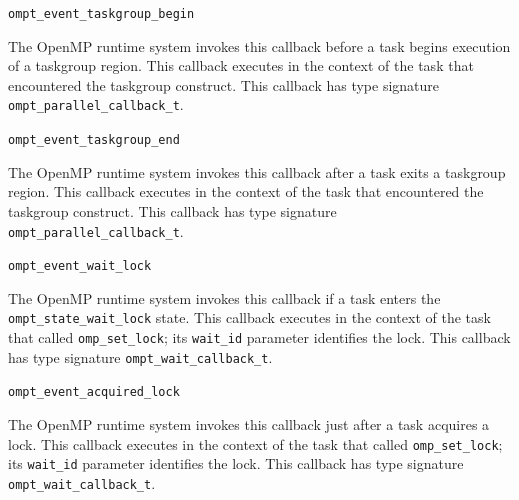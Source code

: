 \documentclass{article}
\newcommand{\descheader}[1]{{\needspace{3\baselineskip}\vspace{1em}\noindent \fbox{#1}}}
\begin{document}
\begin{description}
 
\item \verb|ompt_event_taskgroup_begin|

  The OpenMP runtime system invokes this callback before a task begins execution of a taskgroup region. This callback executes
  in the context of the task that encountered the taskgroup construct.
  This callback has type signature \verb|ompt_parallel_callback_t|. 
 
\item \verb|ompt_event_taskgroup_end|

  The OpenMP runtime system invokes this callback after a task exits a taskgroup region.  This callback
  executes in the context of the task that encountered the taskgroup construct.
  This callback has type signature \verb|ompt_parallel_callback_t|. 

\end{description}

\descheader{Locks}

\begin{description}

\item \verb|ompt_event_wait_lock| 
 
   The OpenMP runtime system invokes this callback if a task
   enters the \verb|ompt_state_wait_lock| 
   state.  This callback executes in the context of the task that called \verb|omp_set_lock|;
   its \verb|wait_id| parameter identifies the lock.
   This callback has type signature \verb|ompt_wait_callback_t|. 

\item \verb|ompt_event_acquired_lock| 
 
   The OpenMP runtime system invokes this callback just after a
   task acquires a lock.  This callback executes in the
   context of the task that called \verb|omp_set_lock|; its \verb|wait_id| parameter identifies the  %
   lock.
   This callback  has type signature \verb|ompt_wait_callback_t|.

\end{description}

\descheader{Nest Locks}
\end{document}
